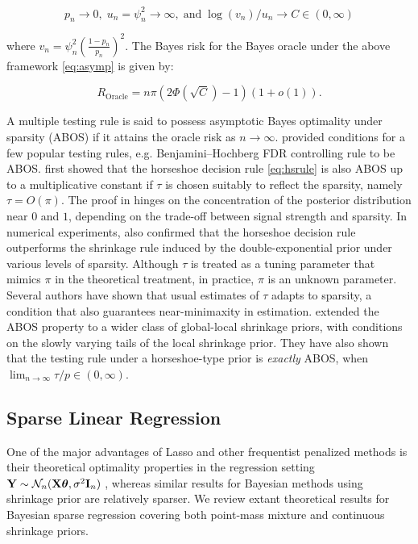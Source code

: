 \documentclass[sts,preprint]{imsart}
\begin{document}
\begin{equation}
p_n \to 0, \; u_n = \psi_n^2 \to \infty, \; \text{and} \; \log(v_n)/u_n \to C \in (0,\infty) \label{eq:asymp}
\end{equation}

where $v_n = \psi_n^2 (\frac{1-p_n}{p_n})^2$. The Bayes risk for the Bayes oracle under the above framework \eqref{eq:asymp} is given by:

\[
R_{\text{Oracle}} = n \pi (2 \Phi(\sqrt{C}) - 1)(1+o(1)).
\]

A multiple testing rule is said to possess asymptotic Bayes optimality under sparsity (ABOS) if it attains the oracle risk as $n \to \infty$. \citet{bogdan2011asymptotic} provided conditions for a few popular testing rules, e.g. Benjamini--Hochberg FDR controlling rule to be ABOS. \citet{datta2013asymptotic} first showed that the horseshoe decision rule \eqref{eq:hsrule} is also ABOS up to a multiplicative constant if $\tau$ is chosen suitably to reflect the sparsity, namely $\tau = O(\pi)$. The proof in \citet{datta2013asymptotic} hinges on the concentration of the posterior distribution near $0$ and $1$, depending on the trade-off between signal strength and sparsity.  In numerical experiments, \citet{datta2013asymptotic} also confirmed that the horseshoe decision rule outperforms the shrinkage rule induced by the double-exponential prior under various levels of sparsity. 
Although $\tau$ is treated as a tuning parameter that mimics $\pi$ in the theoretical treatment, in practice, $\pi$ is an unknown parameter. Several authors \cite{datta2013asymptotic, ghosh2016asymptotic, ghosh2016testing,van2016many} have shown that usual estimates of $\tau$ adapts to sparsity, a condition that also guarantees near-minimaxity in estimation. \citet{ghosh2016testing} extended the ABOS property to a wider class of global-local shrinkage priors, with conditions on the slowly varying tails of the local shrinkage prior. They have also shown that the testing rule under a horseshoe-type prior is \textit{exactly} ABOS, when $\lim_{n \to \infty} \tau/p \in (0, \infty)$. 

\subsection{Sparse Linear Regression}\label{sec:sparse-linreg}

One of the major advantages of Lasso and other frequentist penalized methods is their theoretical optimality properties in the regression setting ${\bf Y} \sim {\cal N}_n({\bf X} \boldsymbol{\theta}, \sigma^2 {\bf I}_n)$ \citep[e.g.]{buhlmann2011statistics}, whereas similar results for Bayesian methods using shrinkage prior are relatively sparser. We review extant theoretical results for Bayesian sparse regression covering both point-mass mixture and continuous shrinkage priors. 
\end{document}
